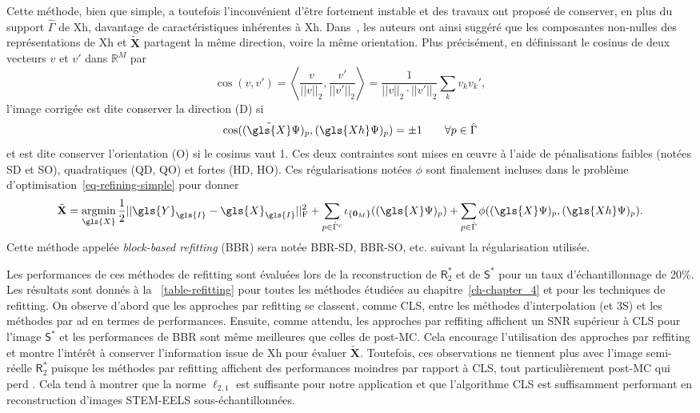 Cette méthode, bien que simple, a toutefois l'inconvénient d'être fortement instable et des travaux ont proposé de conserver, en plus du support $\hat{\Gamma}$ de \gls{Xh}, davantage de caractéristiques inhérentes à \gls{Xh}. Dans~\cite{deledalle2019block}, les auteurs ont ainsi suggéré que les composantes non-nulles des représentations de \gls{Xh} et $\tilde{\mathbf{X}}$ partagent la même direction, voire la même orientation. Plus précisément, en définissant le cosinus de deux vecteurs $v$ et $v'$ dans $\mathbb{R}^M$ par
\begin{equation}
    \cos(v, v') = \left< \frac{v}{||v||_2} , \frac{v'}{||v'||_2} \right> = \frac{1}{||v||_2\cdot||v'||_2}\sum_k v_kv_k',
\end{equation}
l'image corrigée est dite conserver la direction (D) si 
\begin{equation}
    \cos( (\tilde{\gls{X}}\Psi)_p , (\gls{Xh}\Psi)_p ) = \pm 1 \qquad \forall p\in\hat{\Gamma}
\end{equation}
et est dite conserver l'orientation (O) si le cosinus vaut 1. Ces deux contraintes sont mises en \oe{}uvre à l'aide de pénalisations faibles (notées SD et SO), quadratiques (QD, QO) et fortes (HD, HO). Ces régularisations notées $\phi$ sont finalement incluses dans le problème d'optimisation~\ref{eq-refining-simple} pour donner
\begin{equation}
\tilde{\mathbf{X}} = \argmin_{\gls{X}} 
%
\frac{1}{2}\frobnorm{\gls{Y}_{\gls{I}} - \gls{X}_{\gls{I}}} + 
%
\sum_{p\in\hat{\Gamma}^c} \iota_{\{\mathbf{0}_M\}}((\gls{X}\Psi)_p) +
%
\sum_{p\in\hat{\Gamma}} \phi( (\gls{X}\Psi)_p , (\gls{Xh}\Psi)_p ).
\end{equation}
Cette méthode appelée \emph{block-based refitting} (BBR) sera notée BBR-SD, BBR-SO, etc. suivant la régularisation utilisée.

Les performances de ces méthodes de refitting sont évaluées lors de la reconstruction de $\mathsf{R}_2^*$ et de $\mathsf{S}^*$ pour un taux d'échantillonnage de 20\%. Les résultats sont donnés à la \tabname~\ref{table-refitting} pour toutes les méthodes étudiées au chapitre~\ref{ch-chapter_4} et pour les techniques de refitting.
%
On observe d'abord que les approches par refitting se classent, comme CLS, entre les méthodes d'interpolation (et 3S) et les méthodes par \gls{ad} en termes de performances. 
%
Ensuite, comme attendu, les approches par reffiting affichent un SNR supérieur à CLS pour l'image $\mathsf{S}^*$ et les performances de BBR sont même meilleures que celles de post-MC.
%
Cela encourage l'utilisation des approches par reffiting et montre l'intérêt à conserver l'information issue de \gls{Xh} pour évaluer $\tilde{\mathbf{X}}$. 
%
Toutefois, ces observations ne tiennent plus avec l'image semi-réelle $\mathsf{R}_2^*$ puisque les méthodes par refitting affichent des performances moindres par rapport à CLS, tout particulièrement post-MC qui perd . 
%
Cela tend à montrer que la norme $\ell_{2, 1}$ est suffisante pour notre application et que l'algorithme CLS est suffisamment performant en reconstruction d'images STEM-EELS sous-échantillonnées.


